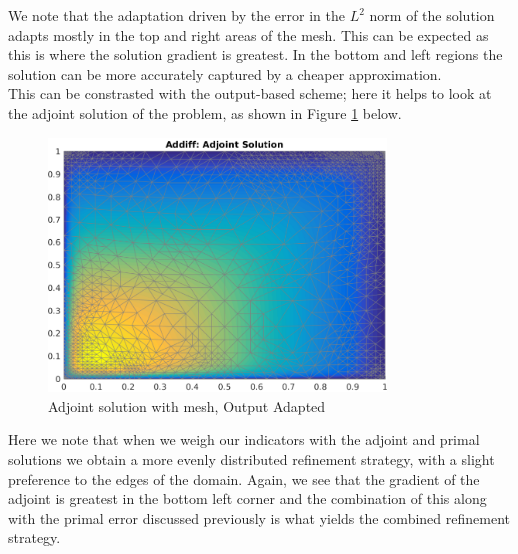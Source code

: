 \documentclass{article}
\begin{document}
\begin{itemize}
	We note that the adaptation driven by the error in the \(L^2\) norm of the solution adapts mostly in the top and right areas of the mesh. This can be expected as this is where the solution gradient is greatest. In the bottom and left regions the solution can be more accurately captured by a cheaper approximation.\\
	
	This can be constrasted with the output-based scheme; here it helps to look at the adjoint solution of the problem, as shown in Figure \ref{fig:out_adj} below.
	\begin{figure}[H]
		\centering
		\includegraphics[width=0.8\textwidth]{addiff_adjoint.pdf}
		\caption{Adjoint solution with mesh, Output Adapted}
		\label{fig:out_adj}
	\end{figure}
	Here we note that when we weigh our indicators with the adjoint and primal solutions we obtain a more evenly distributed refinement strategy, with a slight preference to the edges of the domain. Again, we see that the gradient of the adjoint is greatest in the bottom left corner and the combination of this along with the primal error discussed previously is what yields the combined refinement strategy.
	



\end{itemize}
\end{document}
